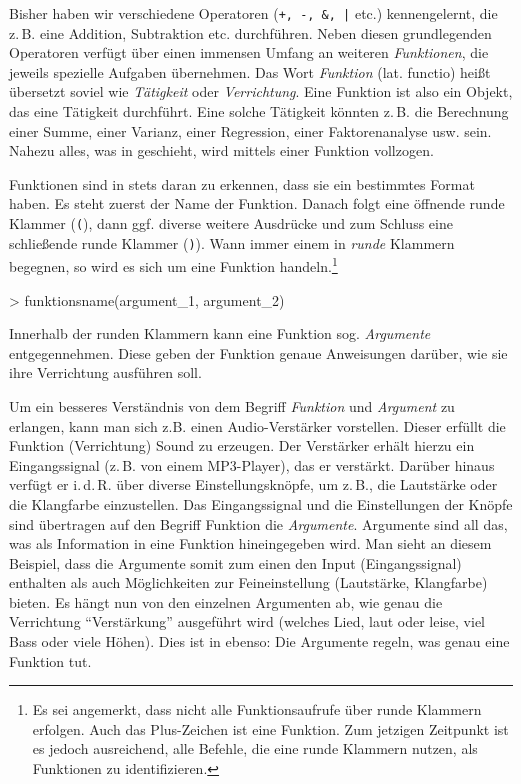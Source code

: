 Bisher haben wir verschiedene Operatoren (\verb!+, -, &, |! etc.) kennengelernt, die z.\,B. eine Addition, Subtraktion etc. durchführen. Neben diesen grundlegenden Operatoren verfügt \R{} über einen immensen Umfang an weiteren \emph{Funktionen}, die jeweils spezielle Aufgaben übernehmen. Das Wort \emph{Funktion} (lat. functio) heißt übersetzt soviel wie \emph{Tätigkeit} oder \emph{Verrichtung}. Eine Funktion ist also ein Objekt, das eine Tätigkeit durchführt. Eine solche Tätigkeit könnten z.\,B. die Berechnung einer Summe, einer Varianz, einer Regression, einer Faktorenanalyse usw. sein. Nahezu alles, was in \R{} geschieht, wird mittels einer Funktion vollzogen. 

Funktionen sind in \R{} stets daran zu erkennen, dass sie ein bestimmtes Format haben. Es steht zuerst der Name der Funktion. Danach folgt eine öffnende runde Klammer (\verb!(!), dann ggf. diverse weitere Ausdrücke und zum Schluss eine schließende runde Klammer (\verb!)!). Wann immer einem in \R{} \emph{runde} Klammern begegnen, so wird es sich um eine Funktion handeln.\footnote{Es sei angemerkt, dass nicht alle Funktionsaufrufe über runde Klammern erfolgen. Auch das Plus-Zeichen ist eine Funktion. Zum jetzigen Zeitpunkt ist es jedoch ausreichend, alle Befehle, die eine runde Klammern nutzen, als Funktionen zu identifizieren.}

\begin{Schunk}
\begin{Sinput}
>    funktionsname(argument_1, argument_2)
\end{Sinput}
\end{Schunk}

Innerhalb der runden Klammern kann eine Funktion sog. \emph{Argumente} entgegennehmen. Diese geben der Funktion genaue Anweisungen darüber, wie sie ihre Verrichtung ausführen soll. 

Um ein besseres Verständnis von dem Begriff \emph{Funktion} und \emph{Argument} zu erlangen, kann man sich z.B. einen Audio-Verstärker vorstellen. Dieser erfüllt die Funktion (Verrichtung) Sound zu erzeugen. Der Verstärker erhält hierzu ein Eingangssignal (z.\,B. von einem MP3-Player), das er verstärkt. Darüber hinaus verfügt er i.\,d.\,R. über diverse Einstellungsknöpfe, um z.\,B., die Lautstärke oder die Klangfarbe einzustellen. Das Eingangssignal und die Einstellungen der Knöpfe sind übertragen auf den Begriff Funktion die \emph{Argumente}. Argumente sind all das, was als Information in eine Funktion hineingegeben wird. Man sieht an diesem Beispiel, dass die Argumente somit zum einen den Input (Eingangssignal) enthalten als auch Möglichkeiten zur Feineinstellung (Lautstärke, Klangfarbe) bieten. Es hängt nun von den einzelnen Argumenten ab, wie genau die Verrichtung “Verstärkung” ausgeführt wird (welches Lied, laut oder leise, viel Bass oder viele Höhen). Dies ist in \R{} ebenso: Die Argumente regeln, was genau eine Funktion tut.

